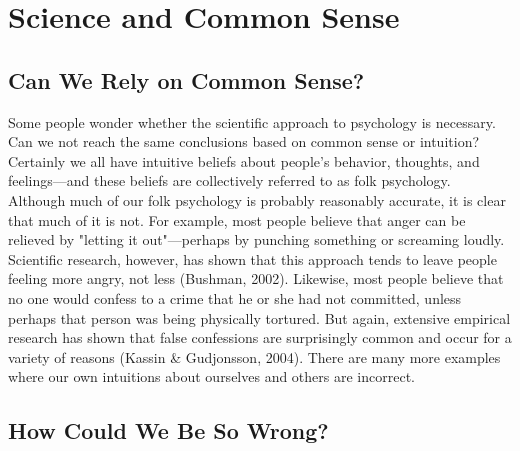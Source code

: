 \newpage
\section{Science and Common Sense}


\subsection{Can We Rely on Common Sense?}
Some people wonder whether the scientific approach to psychology is necessary. Can we not reach the same conclusions based on common sense or intuition? Certainly we all have intuitive beliefs about people's behavior, thoughts, and feelings---and these beliefs are collectively referred to as folk psychology. Although much of our folk psychology is probably reasonably accurate, it is clear that much of it is not. For example, most people believe that anger can be relieved by "letting it out"---perhaps by punching something or screaming loudly. Scientific research, however, has shown that this approach tends to leave people feeling more angry, not less (Bushman, 2002). Likewise, most people believe that no one would confess to a crime that he or she had not committed, unless perhaps that person was being physically tortured. But again, extensive empirical research has shown that false confessions are surprisingly common and occur for a variety of reasons (Kassin \& Gudjonsson, 2004). There are many more examples where our own intuitions about ourselves and others are incorrect.

\subsection{How Could We Be So Wrong?}

